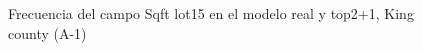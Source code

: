 \begin{figure}[H]
    \centering
    
    \caption{Frecuencia del campo Sqft lot15 en el modelo real y top2+1, King county (A-1)}
    \label{frecuency-top2+1-sqft lot15}
\end{figure}